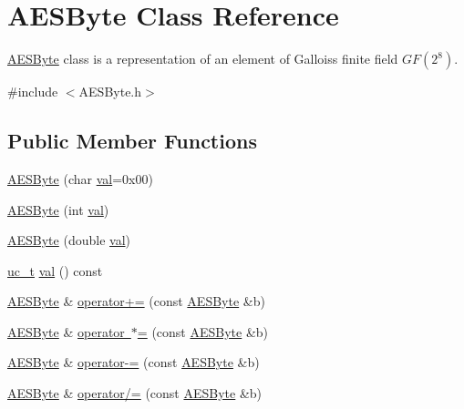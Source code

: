 \hypertarget{class_a_e_s_byte}{}\section{A\+E\+S\+Byte Class Reference}
\label{class_a_e_s_byte}


\mbox{\hyperlink{class_a_e_s_byte}{A\+E\+S\+Byte}} class is a representation of an element of Gallois\textquotesingle{}s finite field $ GF(2^8) $.  




{\ttfamily \#include $<$A\+E\+S\+Byte.\+h$>$}

\subsection*{Public Member Functions}
\begin{DoxyCompactItemize}
\item 
\mbox{\hyperlink{class_a_e_s_byte_a89baf49deb1db33de03629e3ebf7c455}{A\+E\+S\+Byte}} (char \mbox{\hyperlink{class_a_e_s_byte_afce401be62feaec7f04b46801fa35547}{val}}=0x00)
\item 
\mbox{\hyperlink{class_a_e_s_byte_acdc2074102fba0b7de1213c678f2854d}{A\+E\+S\+Byte}} (int \mbox{\hyperlink{class_a_e_s_byte_afce401be62feaec7f04b46801fa35547}{val}})
\item 
\mbox{\hyperlink{class_a_e_s_byte_a02b420231291940553c99362177e1477}{A\+E\+S\+Byte}} (double \mbox{\hyperlink{class_a_e_s_byte_afce401be62feaec7f04b46801fa35547}{val}})
\item 
\mbox{\hyperlink{typedef_8h_a358b32a8fe6aec4f963fe3b413689d12}{uc\+\_\+t}} \mbox{\hyperlink{class_a_e_s_byte_afce401be62feaec7f04b46801fa35547}{val}} () const
\item 
\mbox{\hyperlink{class_a_e_s_byte}{A\+E\+S\+Byte}} \& \mbox{\hyperlink{class_a_e_s_byte_a1ead1e78cb8e6a7cc080585d35387518}{operator+=}} (const \mbox{\hyperlink{class_a_e_s_byte}{A\+E\+S\+Byte}} \&b)
\item 
\mbox{\hyperlink{class_a_e_s_byte}{A\+E\+S\+Byte}} \& \mbox{\hyperlink{class_a_e_s_byte_a14389e87232491d705864fc730f6a121}{operator $\ast$=}} (const \mbox{\hyperlink{class_a_e_s_byte}{A\+E\+S\+Byte}} \&b)
\item 
\mbox{\hyperlink{class_a_e_s_byte}{A\+E\+S\+Byte}} \& \mbox{\hyperlink{class_a_e_s_byte_aa256dd864aa7d591e70c274108c69440}{operator-\/=}} (const \mbox{\hyperlink{class_a_e_s_byte}{A\+E\+S\+Byte}} \&b)
\item 
\mbox{\hyperlink{class_a_e_s_byte}{A\+E\+S\+Byte}} \& \mbox{\hyperlink{class_a_e_s_byte_a036e4c5b6c6172fcd12544214dc93954}{operator/=}} (const \mbox{\hyperlink{class_a_e_s_byte}{A\+E\+S\+Byte}} \&b)
\end{DoxyCompactItemize}
